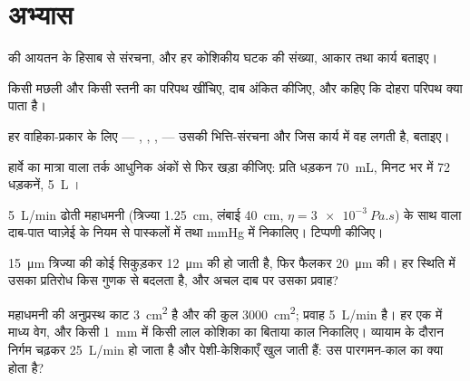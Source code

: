 \section{अभ्यास}

\begin{exercise}[$\star$]\label{exo:b2:blood-circulation:1}
 की आयतन के हिसाब से संरचना, और हर कोशिकीय घटक की संख्या,
आकार तथा कार्य बताइए।
\end{exercise}

\begin{exercise}[$\star$]\label{exo:b2:blood-circulation:2}
किसी मछली और किसी स्तनी का परिपथ खींचिए, दाब अंकित कीजिए, और
कहिए कि दोहरा परिपथ क्या पाता है।
\end{exercise}

\begin{exercise}[$\star$]\label{exo:b2:blood-circulation:3}
हर वाहिका-प्रकार के लिए --- , , ,  --- उसकी
भित्ति-संरचना और जिस कार्य में वह लगती है, बताइए।
\end{exercise}

\begin{exercise}[$\star$]\label{exo:b2:blood-circulation:4}
हार्वे का मात्रा वाला तर्क आधुनिक अंकों से फिर खड़ा कीजिए:
प्रति धड़कन \qty{70}{mL}, मिनट भर में \num{72} धड़कनें, \qty{5}{L} ।
\end{exercise}

\begin{exercise}[$\star\star$]\label{exo:b2:blood-circulation:5}
\qty{5}{L/min} ढोती महाधमनी (त्रिज्या \qty{1.25}{cm},
लंबाई \qty{40}{cm}, $\eta = \qty{3e-3}{Pa.s}$) के साथ वाला दाब-पात
प्वाज़ेई के नियम से पास्कलों में तथा mmHg में निकालिए। टिप्पणी कीजिए।
\end{exercise}

\begin{exercise}[$\star\star$]\label{exo:b2:blood-circulation:6}
\qty{15}{\micro m} त्रिज्या की कोई  सिकुड़कर
\qty{12}{\micro m} की हो जाती है, फिर फैलकर \qty{20}{\micro m} की। हर
स्थिति में उसका प्रतिरोध किस गुणक से बदलता है, और अचल दाब पर उसका
प्रवाह?
\end{exercise}

\begin{exercise}[$\star\star$]\label{exo:b2:blood-circulation:7}
महाधमनी की अनुप्रस्थ काट \qty{3}{cm^2} है और  की कुल
\qty{3000}{cm^2}; प्रवाह \qty{5}{L/min} है। हर एक में माध्य
वेग, और किसी \qty{1}{mm}  में किसी लाल कोशिका का बिताया
काल निकालिए। व्यायाम के दौरान निर्गम चढ़कर
\qty{25}{L/min} हो जाता है और पेशी-केशिकाएँ खुल जाती हैं: उस
पारगमन-काल का क्या होता है?
\end{exercise}


